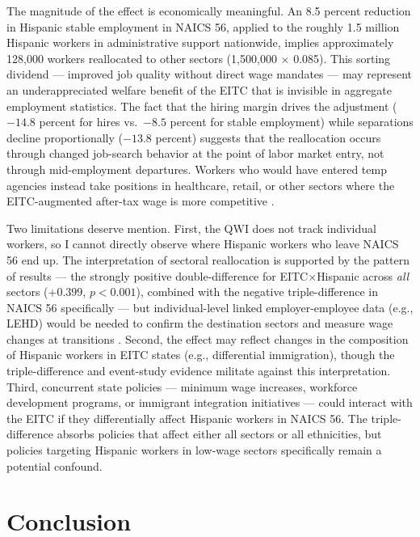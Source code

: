 \documentclass[12pt]{article}
\begin{document}
The magnitude of the effect is economically meaningful. An 8.5 percent reduction in Hispanic stable employment in NAICS 56, applied to the roughly 1.5 million Hispanic workers in administrative support nationwide, implies approximately 128{,}000 workers reallocated to other sectors (1{,}500{,}000 $\times$ 0.085). This sorting dividend --- improved job quality without direct wage mandates --- may represent an underappreciated welfare benefit of the EITC that is invisible in aggregate employment statistics. The fact that the hiring margin drives the adjustment ($-14.8$ percent for hires vs.\ $-8.5$ percent for stable employment) while separations decline proportionally ($-13.8$ percent) suggests that the reallocation occurs through changed job-search behavior at the point of labor market entry, not through mid-employment departures. Workers who would have entered temp agencies instead take positions in healthcare, retail, or other sectors where the EITC-augmented after-tax wage is more competitive \citep{rothstein2010eitc, leigh2010earned}.

Two limitations deserve mention. First, the QWI does not track individual workers, so I cannot directly observe where Hispanic workers who leave NAICS 56 end up. The interpretation of sectoral reallocation is supported by the pattern of results --- the strongly positive double-difference for EITC$\times$Hispanic across \textit{all} sectors ($+0.399$, $p < 0.001$), combined with the negative triple-difference in NAICS 56 specifically --- but individual-level linked employer-employee data (e.g., LEHD) would be needed to confirm the destination sectors and measure wage changes at transitions \citep{hoynes2012earned}. Second, the effect may reflect changes in the composition of Hispanic workers in EITC states (e.g., differential immigration), though the triple-difference and event-study evidence militate against this interpretation. Third, concurrent state policies --- minimum wage increases, workforce development programs, or immigrant integration initiatives --- could interact with the EITC if they differentially affect Hispanic workers in NAICS 56. The triple-difference absorbs policies that affect either all sectors or all ethnicities, but policies targeting Hispanic workers in low-wage sectors specifically remain a potential confound.

\section{Conclusion}
\end{document}
